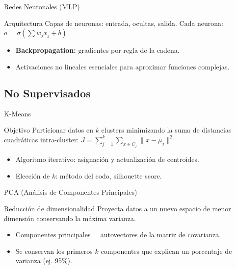 \documentclass[aspectratio=169, 10pt, xcolor=table]{beamer}
\begin{document}
\begin{frame}{Redes Neuronales (MLP)}
    \begin{block}{Arquitectura}
        Capas de neuronas: entrada, ocultas, salida. Cada neurona: $a = \sigma(\sum w_j x_j + b)$.
    \end{block}
    \begin{itemize}
        \item \textbf{Backpropagation:} gradientes por regla de la cadena.
        \item Activaciones no lineales esenciales para aproximar funciones complejas.
    \end{itemize}
\end{frame}

\subsection{No Supervisados}

\begin{frame}{K-Means}
    \begin{block}{Objetivo}
        Particionar datos en $k$ clusters minimizando la suma de distancias cuadráticas intra-cluster:
        $J = \sum_{j=1}^k \sum_{x\in C_j} \|x-\mu_j\|^2$
    \end{block}
    \begin{itemize}
        \item Algoritmo iterativo: asignación y actualización de centroides.
        \item Elección de $k$: método del codo, silhouette score.
    \end{itemize}
\end{frame}

\begin{frame}{PCA (Análisis de Componentes Principales)}
    \begin{block}{Reducción de dimensionalidad}
        Proyecta datos a un nuevo espacio de menor dimensión conservando la máxima varianza.
    \end{block}
    \begin{itemize}
        \item Componentes principales = autovectores de la matriz de covarianza.
        \item Se conservan los primeros $k$ componentes que explican un porcentaje de varianza (ej. 95\%).
    \end{itemize}
\end{frame}
\end{document}
